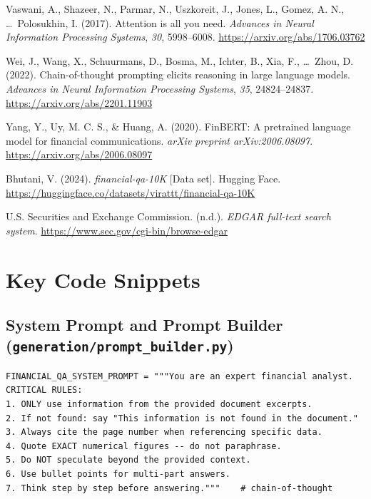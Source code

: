 \documentclass[12pt,a4paper]{article}
\begin{document}
\begin{enumerate}[label={[\arabic*]}, leftmargin=*, itemsep=2pt]
\item Vaswani, A., Shazeer, N., Parmar, N., Uszkoreit, J., Jones, L., Gomez, A. N., \ldots\ Polosukhin, I. (2017). Attention is all you need. \textit{Advances in Neural Information Processing Systems}, \textit{30}, 5998--6008. \url{https://arxiv.org/abs/1706.03762}

\item Wei, J., Wang, X., Schuurmans, D., Bosma, M., Ichter, B., Xia, F., \ldots\ Zhou, D. (2022). Chain-of-thought prompting elicits reasoning in large language models. \textit{Advances in Neural Information Processing Systems}, \textit{35}, 24824--24837. \url{https://arxiv.org/abs/2201.11903}

\item Yang, Y., Uy, M. C. S., \& Huang, A. (2020). FinBERT: A pretrained language model for financial communications. \textit{arXiv preprint arXiv:2006.08097}. \url{https://arxiv.org/abs/2006.08097}

\item Bhutani, V. (2024). \textit{financial-qa-10K} [Data set]. Hugging Face. \url{https://huggingface.co/datasets/virattt/financial-qa-10K}

\item U.S. Securities and Exchange Commission. (n.d.). \textit{EDGAR full-text search system}. \url{https://www.sec.gov/cgi-bin/browse-edgar}

\end{enumerate}
\normalsize

\appendix
\section{Key Code Snippets}

\subsection{System Prompt and Prompt Builder (\texttt{generation/prompt\_builder.py})}

\begin{lstlisting}[caption={System prompt with 7 critical rules (systematic design + chain-of-thought)}]
FINANCIAL_QA_SYSTEM_PROMPT = """You are an expert financial analyst.
CRITICAL RULES:
1. ONLY use information from the provided document excerpts.
2. If not found: say "This information is not found in the document."
3. Always cite the page number when referencing specific data.
4. Quote EXACT numerical figures -- do not paraphrase.
5. Do NOT speculate beyond the provided context.
6. Use bullet points for multi-part answers.
7. Think step by step before answering."""    # chain-of-thought
\end{lstlisting}
\end{document}
